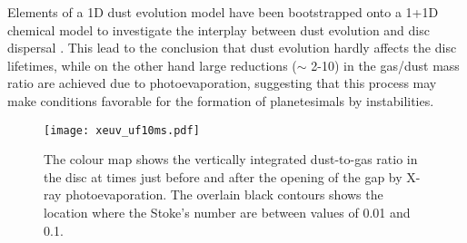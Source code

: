 \documentclass{rsos}
\begin{document}
Elements of a 1D dust evolution model  \cite{2011A&A...525A..11B} have been bootstrapped onto a 1+1D chemical model to investigate the interplay between dust evolution and disc dispersal \cite{2015ApJ...804...29G}. This lead to the conclusion that dust evolution hardly affects the disc lifetimes, while on the other hand large reductions ($\sim$ 2-10) in the gas/dust mass ratio are achieved due to photoevaporation, suggesting that this process may make conditions favorable for the formation of planetesimals by instabilities.

\begin{figure}[b]
\centering
\texttt{[image: xeuv\_uf10ms.pdf]}
\caption{The colour map shows the vertically integrated dust-to-gas ratio in the disc at times just before and after the opening of the gap by X-ray photoevaporation. The overlain  black contours shows the location where the Stoke's number are between values of 0.01 and 0.1. 
}\label{fig:si}
\end{figure}
\end{document}
